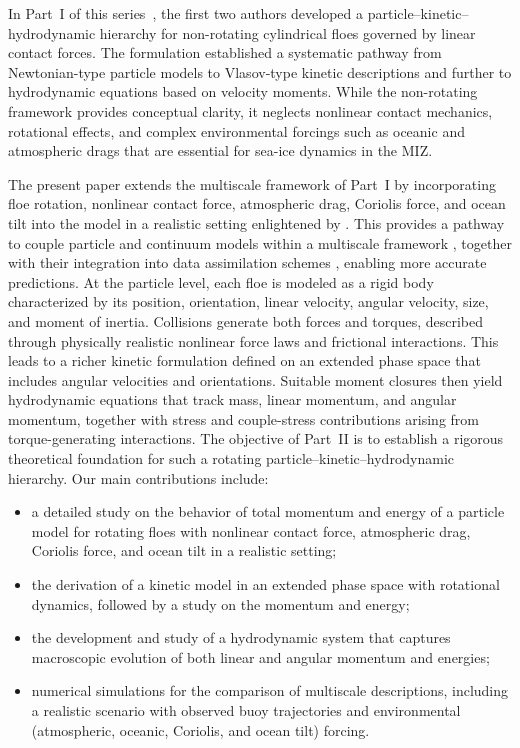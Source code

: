 \documentclass[a4paper,11pt]{article}
\numberwithin{equation}{section}
\theoremstyle{definition}
\begin{document}
In Part~I of this series~\cite{deng2025particle}, the first two authors developed a particle--kinetic--hydrodynamic hierarchy for non-rotating cylindrical floes governed by linear contact forces. The formulation established a systematic pathway from Newtonian-type particle models to Vlasov-type kinetic descriptions and further to hydrodynamic equations based on velocity moments. While the non-rotating framework provides conceptual clarity, it neglects nonlinear contact mechanics, rotational effects, and complex environmental forcings such as oceanic and atmospheric drags that are essential for sea-ice dynamics in the MIZ.

The present paper extends the multiscale framework of Part~I by incorporating floe rotation, nonlinear contact force, atmospheric drag, Coriolis force, and ocean tilt into the model in a realistic setting enlightened by \cite{coon1974modeling, feltham2008sea, alberello2020drift}. This provides a pathway to couple particle and continuum models within a multiscale framework \cite{deng2024particle}, together with their integration into data assimilation schemes \cite{deng2025lemda,chen2022superfloe,chen2022efficient}, enabling more accurate predictions. At the particle level, each floe is modeled as a rigid body characterized by its position, orientation, linear velocity, angular velocity, size, and moment of inertia. Collisions generate both forces and torques, described through physically realistic nonlinear force laws and frictional interactions. This leads to a richer kinetic formulation defined on an extended phase space that includes angular velocities and orientations. Suitable moment closures then yield hydrodynamic equations that track mass, linear momentum, and angular momentum, together with stress and couple-stress contributions arising from torque-generating interactions.
%
The objective of Part~II is to establish a rigorous theoretical foundation for such a rotating particle--kinetic--hydrodynamic hierarchy. Our main contributions include:
\begin{itemize}
    \item a detailed study on the behavior of total momentum and energy of a particle model for rotating floes with nonlinear contact force, atmospheric drag, Coriolis force, and ocean tilt in a realistic setting;
    \item the derivation of a kinetic model in an extended phase space with rotational dynamics, followed by a study on the momentum and energy;
    \item the development and study of a hydrodynamic system that captures macroscopic evolution of both linear and angular momentum and energies;
    \item numerical simulations for the comparison of multiscale descriptions, including a realistic scenario with observed buoy trajectories and environmental (atmospheric, oceanic, Coriolis, and ocean tilt) forcing.

\end{itemize}
\end{document}
